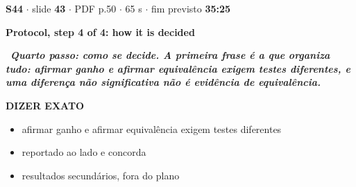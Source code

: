 \documentclass[11pt,a4paper]{article}
\begin{document}
\begin{tcolorbox}[breakable,colback=white,colframe=teal!55,boxrule=0.6pt,arc=2pt,left=3mm,right=3mm,top=2mm,bottom=2mm]
{\small\color{soft}\textbf{S44} $\cdot$ slide \textbf{43} $\cdot$ PDF p.50 $\cdot$ 65 s $\cdot$ fim previsto \textbf{35:25}}\par\vspace{1mm}
{\large\bfseries\color{ink} Protocol, step 4 of 4: how it is decided}\par\vspace{2mm}
{\color{teal}\textbf{\textrightarrow}}\ \textbf{\itshape Quarto passo: como se decide. A primeira frase é a que organiza tudo: afirmar ganho e afirmar equivalência exigem testes diferentes, e uma diferença não significativa não é evidência de equivalência.}\par\vspace{1.5mm}
{\small\color{teal}\textbf{DIZER EXATO}}
\begin{itemize}[leftmargin=6mm,itemsep=0.4mm,topsep=0.8mm]
\item afirmar ganho e afirmar equivalência exigem testes diferentes
\item reportado ao lado e concorda
\item resultados secundários, fora do plano
\end{itemize}
\par
{}\par

\end{tcolorbox}
\end{document}

